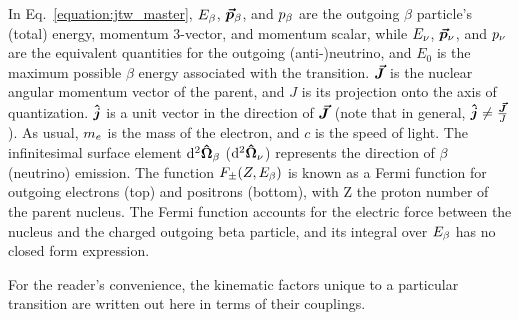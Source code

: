 In Eq.~\ref{equation:jtw_master}, $E_{\beta}$, $\bm{\vec{p}}_{\beta}$, and $p_{\beta}$ are the outgoing $\beta$ particle's (total) energy, momentum 3-vector, and momentum scalar, while $E_{\nu}$, $\bm{\vec{p}}_{\nu}$, and $p_{\nu}$ are the equivalent quantities for the outgoing (anti-)neutrino, and $E_0$ is the maximum possible $\beta$ energy associated with the transition.   $\bm{\vec{J}}$ is the nuclear angular momentum vector of the parent, and $J$ is its projection onto the axis of quantization. $\bm{\hat{j}}$ is a unit vector in the direction of $\bm{\vec{J}}$ (note that in general, $\bm{\hat{j}} \neq \frac{\bm{\vec{J}}}{J}$).  As usual, $m_e$ is the mass of the electron, and $c$ is the speed of light.  The infinitesimal surface element $\mathrm{d}^{2} \bm{\hat{\Omega}}_\beta$ ($\mathrm{d}^{2} \bm{\hat{\Omega}}_\nu$) represents the direction of $\beta$ (neutrino) emission.  The function $F_{\pm}(Z, E_\beta)$ is known as a Fermi function for outgoing electrons (top) and positrons (bottom), with Z the proton number of the parent nucleus.  The Fermi function accounts for the electric force between the nucleus and the charged outgoing beta particle, and its integral over $E_{\beta}$ has no closed form expression.


For the reader's convenience, the kinematic factors unique to a particular transition are written out here in terms of their couplings.  %


